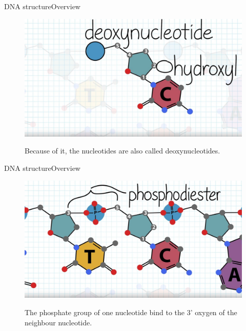 \documentclass[10pt]{beamer}
\begin{document}
{%
\begin{frame}{DNA structure}{Overview}
	\begin{figure}[]
		\centering
		\includegraphics[width=\textwidth,height=0.7\textheight,keepaspectratio]{img/introduction/dna14.jpg}
		\label{img:mot2}
		\caption{Because of it, the nucleotides are also called deoxynucleotides.}
	\end{figure}
\end{frame}

\begin{frame}{DNA structure}{Overview}
	\begin{figure}[]
		\centering
		\includegraphics[width=\textwidth,height=0.7\textheight,keepaspectratio]{img/introduction/dna15.jpg}
		\label{img:mot2}
		\caption{The phosphate group of one nucleotide bind to the 3' oxygen of the neighbour nucleotide.}
	\end{figure}
\end{frame}

}
\end{document}
